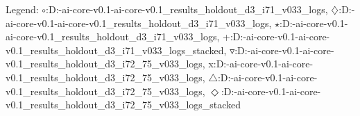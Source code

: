 Legend: {\color{CornflowerBlue}$\circ$}:D:\engineering-ai-core-v0.1\engineering-ai-core-v0.1\exdata\validation\_results\bbob\_holdout\_d3\_i71\_v033\coco\_logs\cmaes, {{}$\diamondsuit$}:D:\engineering-ai-core-v0.1\engineering-ai-core-v0.1\exdata\validation\_results\bbob\_holdout\_d3\_i71\_v033\coco\_logs\ngopt, {\color{Green}$\star$}:D:\engineering-ai-core-v0.1\engineering-ai-core-v0.1\exdata\validation\_results\bbob\_holdout\_d3\_i71\_v033\coco\_logs\stacked, {\color{red}+}:D:\engineering-ai-core-v0.1\engineering-ai-core-v0.1\exdata\validation\_results\bbob\_holdout\_d3\_i71\_v033\coco\_logs\adaptive\_stacked, {\color{brown}$\triangledown$}:D:\engineering-ai-core-v0.1\engineering-ai-core-v0.1\exdata\validation\_results\bbob\_holdout\_d3\_i72\_75\_v033\coco\_logs\cmaes, {{}x}:D:\engineering-ai-core-v0.1\engineering-ai-core-v0.1\exdata\validation\_results\bbob\_holdout\_d3\_i72\_75\_v033\coco\_logs\ngopt, {{}$\triangle$}:D:\engineering-ai-core-v0.1\engineering-ai-core-v0.1\exdata\validation\_results\bbob\_holdout\_d3\_i72\_75\_v033\coco\_logs\stacked, {{}$\Diamond$}:D:\engineering-ai-core-v0.1\engineering-ai-core-v0.1\exdata\validation\_results\bbob\_holdout\_d3\_i72\_75\_v033\coco\_logs\adaptive\_stacked